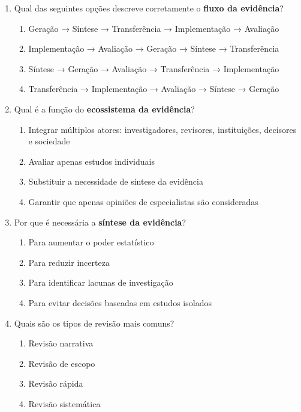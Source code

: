 \documentclass[12pt,a4paper]{article}
\begin{document}
\begin{enumerate}[label=\textbf{Q\arabic*:}]
\item Qual das seguintes opções descreve corretamente o \textbf{fluxo da evidência}?
\begin{enumerate}[label=\alph*)]
    \item Geração → Síntese → Transferência → Implementação → Avaliação
    \item Implementação → Avaliação → Geração → Síntese → Transferência
    \item Síntese → Geração → Avaliação → Transferência → Implementação
    \item Transferência → Implementação → Avaliação → Síntese → Geração
\end{enumerate}

\item Qual é a função do \textbf{ecossistema da evidência}?
\begin{enumerate}[label=\alph*)]
    \item Integrar múltiplos atores: investigadores, revisores, instituições, decisores e sociedade
    \item Avaliar apenas estudos individuais
    \item Substituir a necessidade de síntese da evidência
    \item Garantir que apenas opiniões de especialistas são consideradas
\end{enumerate}

\item Por que é necessária a \textbf{síntese da evidência}?
\begin{enumerate}[label=\alph*)]
    \item Para aumentar o poder estatístico
    \item Para reduzir incerteza
    \item Para identificar lacunas de investigação
    \item Para evitar decisões baseadas em estudos isolados
\end{enumerate}

\item Quais são os tipos de revisão mais comuns?
\begin{enumerate}[label=\alph*)]
    \item Revisão narrativa
    \item Revisão de escopo
    \item Revisão rápida
    \item Revisão sistemática
\end{enumerate}


\end{enumerate}
\end{document}
